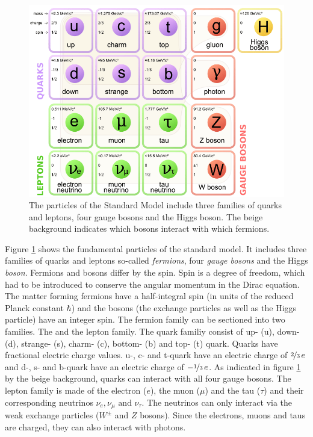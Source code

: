 \documentclass[a4paper,11pt,twosided,final,german,openbib,pdftex,listof=totoc,bibliography=totoc]{scrbook}
\begin{document}
\begin{figure}[h!]
	\centering
	\includegraphics[width=15cm]{Bilder/SM.png}
	\caption[Standard Model]{The particles of the Standard Model include three families of quarks and leptons, four gauge bosons and the Higgs boson. The beige background indicates which bosons interact with which fermions. \cite{SMFigure}}
	\label{fig:SM}
\end{figure}



Figure \ref{fig:SM} shows the fundamental particles of the standard model. It includes three families of quarks and leptons so-called \textit{fermions}, four \textit{gauge bosons} and the Higgs \textit{boson}. Fermions and bosons differ by the spin. Spin is a degree of freedom, which had to be introduced to conserve the angular momentum in the Dirac equation. The matter forming fermions have a half-integral spin (in units of the reduced Planck constant $\hbar$) and the bosons (the exchange particles as well as the Higgs particle) have an integer spin. The fermion family can be sectioned into two families. The  and the lepton family. 
The quark familiy consist of up- (u), down- (d), strange- (s), charm- (c), bottom- (b) and top- (t) quark. Quarks have fractional electric charge values. u-, c- and t-quark have an electric charge of $\nicefrac{2}{3} \,e$ and d-, s- and b-quark have an electric charge of $-\nicefrac{1}{3} \,e$. As indicated in figure \ref{fig:SM} by the beige background, quarks can interact with all four gauge bosons.
The lepton family is made of the electron ($e$), the muon ($\mu$) and the tau ($\tau$) and their corresponding neutrinos $\nu_e,\nu_{\mu} \textrm{ and } \nu_{\tau}$. The neutrinos can only interact via the weak exchange particles ($W^{\pm}$ and $Z$ bosons). Since the electrons, muons and taus are charged, they can also interact with photons.
\end{document}
